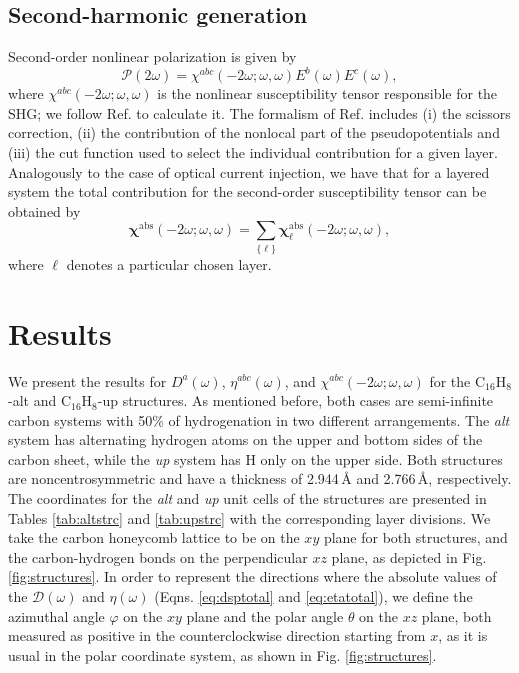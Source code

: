 \documentclass[pss]{wiley2sp} %
\begin{document}
\subsection{Second-harmonic generation}\label{sec:theory-SHG}
Second-order nonlinear polarization is given by \cite{andersonPRB15} 
\begin{equation*}\label{eq:pol}
\mathcal{P}(2\omega) = 
\chi^{abc}(-2\omega;\omega,\omega)E^{b}(\omega)E^{c}(\omega),
\end{equation*} 
where $\chi^{abc}(-2\omega;\omega,\omega)$ is the nonlinear
susceptibility tensor responsible for the SHG; we follow Ref.
\cite{andersonPRB15} to calculate it. The 
formalism of Ref. \cite{andersonPRB15} includes (i) the scissors correction,
(ii) the contribution of the nonlocal part of the pseudopotentials and (iii)
the cut function used to select the individual contribution for a given layer.
Analogously to the case of optical current injection, we have that for a layered
system the total contribution for the second-order susceptibility tensor can be
obtained by
\begin{equation}
\boldsymbol{\chi}^{\mathrm{abs}}(-2\omega;\omega,\omega) = 
\sum_{\{\ell\}} \boldsymbol{\chi}^{\mathrm{abs}}_{\ell}(-2\omega;\omega,\omega),
\end{equation}
where $\ell$ denotes a particular chosen layer.

\section{Results}\label{sec:results}

We present the results for {$D^{a}(\omega)$}, {$\eta^{abc}(\omega)$}, and
$\chi^{abc}(-2\omega;\omega,\omega)$ for the C$_{16}$H$_{8}$-alt and
C$_{16}$H$_{8}$-up structures. As mentioned before, both cases are 
semi-infinite carbon systems with 50\% of hydrogenation in two different
arrangements. The \emph{alt} system has alternating hydrogen atoms on the
upper and bottom sides of the carbon sheet, while the \emph{up} system has H
only on the upper side. Both structures are noncentrosymmetric and have a
thickness of 2.944\,{\AA} and 2.766\,{\AA}, respectively. The coordinates for
the \emph{alt} and \emph{up} unit cells of the structures are presented in
Tables \ref{tab:altstrc} and \ref{tab:upstrc} with the corresponding layer
divisions. We take the carbon honeycomb lattice to be on the $xy$ plane for
both structures, and the carbon-hydrogen bonds on the perpendicular $xz$ plane,
as depicted in Fig.\ref{fig:structures}. In order to represent the directions
where the absolute values of the $\mathcal{D}(\omega)$ and $\eta(\omega)$
(Eqns. \eqref{eq:dsptotal} and \eqref{eq:etatotal}), we define the azimuthal
angle $\varphi$ on the $xy$ plane and the polar angle $\theta$ on the $xz$
plane, both measured as positive in the counterclockwise direction
starting from $x$, as it is
usual in the polar coordinate system, as shown in Fig. \ref{fig:structures}.
\end{document}
